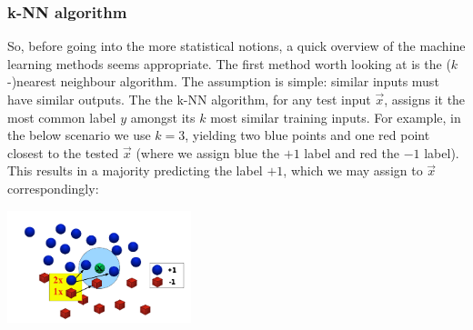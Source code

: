 \documentclass{article}
\begin{document}
\subsubsection{k-NN algorithm}
So, before going into the more statistical notions, a quick overview of the machine learning methods seems appropriate. The first method worth looking at is the ($k$-)nearest neighbour algorithm. The assumption is simple: similar inputs must have similar outputs. The the k-NN algorithm, for any test input $\vec{x}$, assigns it the most common label $y$ amongst its $k$ most similar training inputs. For example, in the below scenario we use $k=3$, yielding two blue points and one red point closest to the tested $\vec{x}$ (where we assign blue the $+1$ label and red the $-1$ label). This results in a majority predicting the label $+1$, which we may assign to $\vec{x}$ correspondingly:
\begin{center}\includegraphics[width=0.4\textwidth]{knnfig.png}\end{center}
\end{document}
